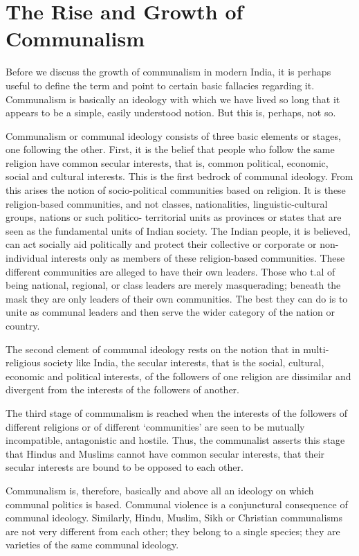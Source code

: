 \chapter{The Rise and Growth of Communalism}
\begin{multicols}{2}

Before we discuss the growth of communalism in modern India, it is perhaps useful to define the term and point to certain basic fallacies regarding it. Communalism is basically an ideology with which we have lived so long that it appears to be a simple, easily understood notion. But this is, perhaps, not so. 

Communalism or communal ideology consists of three basic elements or stages, one following the other. First, it is the belief that people who follow the same religion have common secular interests, that is, common political, economic, social and cultural interests. This is the first bedrock of communal ideology. From this arises the notion of socio-political communities based on religion. It is these religion-based communities, and not classes, nationalities, linguistic-cultural groups, nations or such politico- territorial units as provinces or states that are seen as the fundamental units of Indian society. The Indian people, it is believed, can act socially aid politically and protect their collective or corporate or non-individual interests only as members of these religion-based communities. These different communities are alleged to have their own leaders. Those who t.al of being national, regional, or class leaders are merely masquerading; beneath the mask they are only leaders of their own communities. The best they can do is to unite as communal leaders and then serve the wider category of the nation or country. 

The second clement of communal ideology rests on the notion that in multi-religious society like India, the secular interests, that is the social, cultural, economic and political interests, of the followers of one religion are dissimilar and divergent from the interests of the followers of another. 

The third stage of communalism is reached when the interests of the followers of different religions or of different `communities' are seen to be mutually incompatible, antagonistic and hostile. Thus, the communalist asserts this stage that Hindus and Muslims cannot have common secular interests, that their secular interests are bound to be opposed to each other. 

Communalism is, therefore, basically and above all an ideology on which communal politics is based. Communal violence is a conjunctural consequence of communal ideology. Similarly, Hindu, Muslim, Sikh or Christian communalisms are not very different from each other; they belong to a single species; they are varieties of the same communal ideology. 


\end{multicols}

